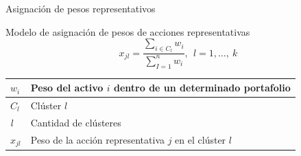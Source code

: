 \documentclass[aspectratio=169,xcolor=dvipsnames]{beamer}
\begin{document}
\begin{frame}{Asignación de pesos representativos}
    \begin{block}{Modelo de asignación de pesos de acciones representativas}
        \begin{equation}
            x_{jl} = \frac{\sum_{i \in C_{l}}^{}w_{i}}{\sum_{I = 1}^{n}w_{i}},\ \ l = 1,\ldots,\ k  \tag{6} 
        \end{equation}
    \end{block}
    \begin{tabularx}{\textwidth}{@{}
        >{\raggedright\arraybackslash}p{}
        >{\raggedright\arraybackslash}X@{}}
        \toprule
        $w_{i}$ & Peso del activo $i$ dentro de un determinado portafolio \\
        \midrule
        $C_{l}$ & Clúster $l$ \\
        \midrule
        \emph{l} & Cantidad de clústeres \\
        \midrule
        $x_{jl}$ & Peso de la acción representativa $j$ en el clúster $l$ \\
        \bottomrule
    \end{tabularx}
\end{frame}
\end{document}
